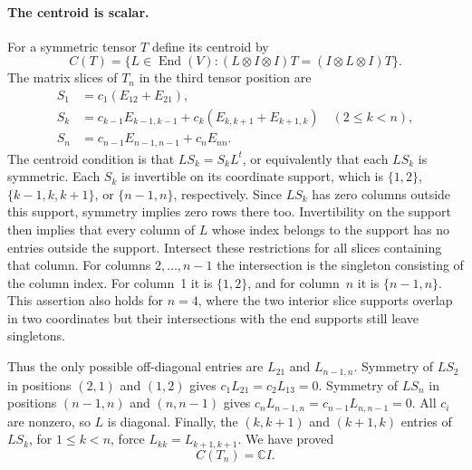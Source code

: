 \paragraph{The centroid is scalar.}
For a symmetric tensor $T$ define its centroid by
\[
 C(T)=\{L\in\operatorname{End}(V):
          (L\otimes I\otimes I)T=(I\otimes L\otimes I)T\}.
\]
The matrix slices of $T_n$ in the third tensor position are
\[
 \begin{split}
 S_1&=c_1(E_{12}+E_{21}),\\
 S_k&=c_{k-1}E_{k-1,k-1}
                    +c_k(E_{k,k+1}+E_{k+1,k})\quad(2\le k<n),\\
 S_n&=c_{n-1}E_{n-1,n-1}+c_nE_{nn}.
 \end{split}                                         \tag{P-F60i}
\]
The centroid condition is that $LS_k=S_kL^t$, or
equivalently that each $LS_k$ is symmetric.
Each $S_k$ is invertible on its coordinate support,
which is $\{1,2\}$, $\{k-1,k,k+1\}$, or
$\{n-1,n\}$, respectively.  Since $LS_k$ has zero
columns outside this support, symmetry implies zero
rows there too.  Invertibility on the support then
implies that every column of $L$ whose index belongs
to the support has no entries outside the support.
Intersect these restrictions for all slices containing
that column.  For columns $2,\ldots,n-1$ the intersection
is the singleton consisting of the column index.
For column~1 it is $\{1,2\}$, and for column~$n$ it
is $\{n-1,n\}$.  This assertion also holds for $n=4$,
where the two interior slice supports overlap in two
coordinates but their intersections with the end
supports still leave singletons.

Thus the only possible off-diagonal entries are
$L_{21}$ and $L_{n-1,n}$.  Symmetry of $LS_2$ in
positions $(2,1)$ and $(1,2)$ gives
$c_1L_{21}=c_2L_{13}=0$.  Symmetry of $LS_n$ in
positions $(n-1,n)$ and $(n,n-1)$ gives
$c_nL_{n-1,n}=c_{n-1}L_{n,n-1}=0$.
All $c_i$ are nonzero, so $L$ is diagonal.
Finally, the $(k,k+1)$ and $(k+1,k)$ entries of
$LS_k$, for $1\le k<n$, force $L_{kk}=L_{k+1,k+1}$.
We have proved
\[
                         C(T_n)=\mathbb C I.            \tag{P-F60j}
\]

